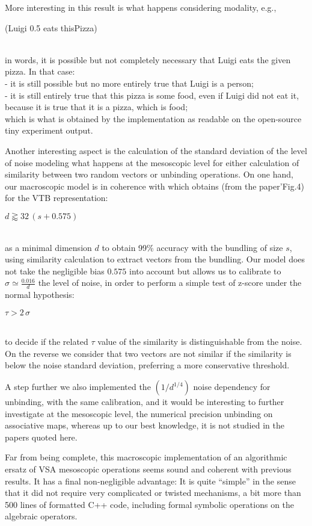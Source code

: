 \documentclass[sn-mathphys]{sn-jnl}
\newcommand{\eqline}[1]{~\vspace{0.1cm}\\\centerline{$#1$}\vspace{0.1cm}\\}
\begin{document}
More interesting in this result is what happens considering modality, e.g.,
\\\centerline{(Luigi 0.5 eats thisPizza)}\\
in words, it is possible but not completely necessary that Luigi eats the given pizza. In that case:
\\- it is still possible but no more entirely true that Luigi is a person;
\\- it is still entirely true that this pizza is some food, even if Luigi did not eat it, because it is true that it is a pizza, which is food;
\\ which is what is obtained by the implementation as readable on the open-source tiny experiment output.

Another interesting aspect is the calculation of the standard deviation of the level of noise modeling what happens at the mesoscopic level for either calculation of similarity between two random vectors or unbinding operations. On one hand, our macroscopic model is in coherence with \cite{schlegel_comparison_2020} which obtains (from the paper'Fig.4) for the VTB representation:
\eqline{d \gtrapprox 32 \, (s + 0.575)}
as a minimal dimension $d$ to obtain 99\% accuracy with the bundling of size $s$, using similarity calculation to extract vectors from the bundling. Our model does not take the negligible bias $0.575$ into account but allows us to calibrate to $\sigma \simeq \frac{0.016}{d}$ the level of noise, in order to perform a simple test of z-score under the normal hypothesis:
\eqline{\tau > 2 \, \sigma}
to decide if the related $\tau$ value of the similarity is distinguishable from the noise. On the reverse we consider that two vectors are not similar if the similarity is below the noise standard deviation, preferring a more conservative threshold.

A step further we also implemented the $(1/d^{1/4})$ noise dependency for unbinding, with the same calibration, and it would be interesting to further investigate at the mesoscopic level, the numerical precision unbinding on associative maps, whereas up to our best knowledge, it is not studied in the papers quoted here.

Far from being complete, this macroscopic implementation of an algorithmic ersatz of VSA mesoscopic operations seems sound and coherent with previous results. It has a final non-negligible advantage: It is quite ``simple'' in the sense that it did not require very complicated or twisted mechanisms, a bit more than 500 lines of formatted C++ code, including formal symbolic operations on the algebraic operators.
\end{document}
